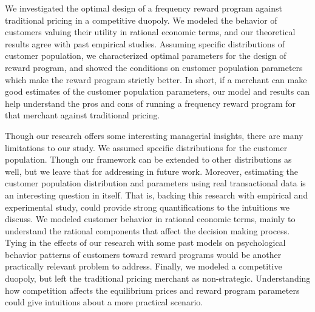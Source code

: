 We investigated the optimal design of a frequency reward program against traditional pricing in a competitive duopoly.
We modeled the behavior of customers valuing their utility in rational economic terms, and our theoretical results agree with past empirical studies.
Assuming specific distributions of customer population, we characterized optimal parameters for the design of reward program, and showed the conditions on customer population parameters which make the reward program strictly better.
In short, if a merchant can make good estimates of the customer population parameters, our model and results can help understand the pros and cons of running a frequency reward program for that merchant against traditional pricing.

Though our research offers some interesting managerial insights, there are many limitations to our study. 
We assumed specific distributions for the customer population. 
Though our framework can be extended to other distributions as well, but we leave that for addressing in future work.
Moreover, estimating the customer population distribution and parameters using real transactional data is an interesting question in itself.
That is, backing this research with empirical and experimental study, could provide strong quantifications to the intuitions we discuss.
We modeled customer behavior in rational economic terms, mainly to understand the rational components that affect the decision making process.
Tying in the effects of our research with some past models on psychological behavior patterns of customers toward reward programs would be another practically relevant problem to address.
Finally, we modeled a competitive duopoly, but left the traditional pricing merchant as non-strategic.
Understanding how competition affects the equilibrium prices and reward program parameters could give intuitions about a more practical scenario. 
